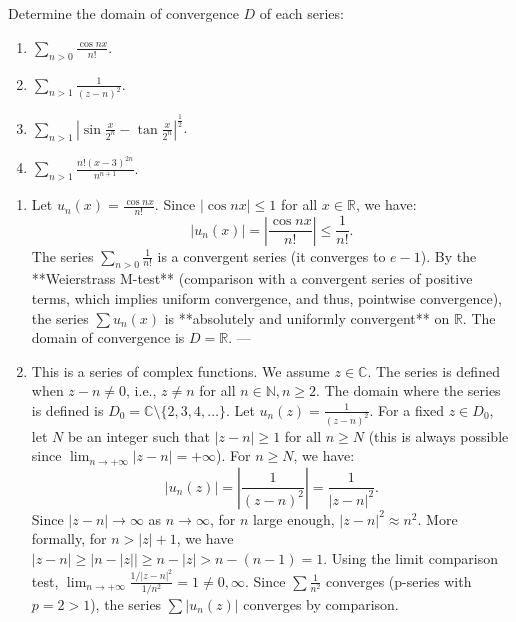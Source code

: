 \documentclass[12pt]{article}
\begin{document}
\section{}
Determine the domain of convergence $D$ of each series:

\begin{enumerate}
    \item $\sum_{n>0} \frac{\cos nx}{n!}$.
    \item $\sum_{n>1} \frac{1}{(z-n)^2}$.
    \item $\sum_{n>1} \left|\sin\frac{x}{2^n} - \tan\frac{x}{2^n}\right|^{\frac{1}{2}}$.
    \item $\sum_{n>1} \frac{n!(x-3)^{2n}}{n^{n+1}}$.
\end{enumerate}

\begin{correctionbox}
\begin{enumerate}
    \item 
    Let $u_n(x) = \frac{\cos nx}{n!}$.
    Since $|\cos nx| \leq 1$ for all $x \in \mathbb{R}$, we have:
    $$ |u_n(x)| = \left|\frac{\cos nx}{n!}\right| \leq \frac{1}{n!}. $$
    The series $\sum_{n>0} \frac{1}{n!}$ is a convergent series (it converges to $e-1$).
    By the **Weierstrass M-test** (comparison with a convergent series of positive terms, which implies uniform convergence, and thus, pointwise convergence), the series $\sum u_n(x)$ is **absolutely and uniformly convergent** on $\mathbb{R}$.
    The domain of convergence is $D = \mathbb{R}$.
    ---
    \item 
    This is a series of complex functions. We assume $z \in \mathbb{C}$. The series is defined when $z-n \neq 0$, i.e., $z \neq n$ for all $n \in \mathbb{N}, n \geq 2$.
    The domain where the series is defined is $D_0 = \mathbb{C} \setminus \{2, 3, 4, \ldots\}$.
    Let $u_n(z) = \frac{1}{(z-n)^2}$.
    For a fixed $z \in D_0$, let $N$ be an integer such that $|z-n| \geq 1$ for all $n \geq N$ (this is always possible since $\lim_{n \to +\infty} |z-n| = +\infty$).
    For $n \geq N$, we have:
    $$ |u_n(z)| = \left|\frac{1}{(z-n)^2}\right| = \frac{1}{|z-n|^2}. $$
    Since $|z-n| \to \infty$ as $n \to \infty$, for $n$ large enough, $|z-n|^2 \approx n^2$.
    More formally, for $n > |z|+1$, we have $|z-n| \geq |n - |z|| \geq n - |z| > n - (n-1) = 1$.
    Using the limit comparison test, $\lim_{n \to +\infty} \frac{1/|z-n|^2}{1/n^2} = 1 \neq 0, \infty$.
    Since $\sum \frac{1}{n^2}$ converges (p-series with $p=2 > 1$), the series $\sum |u_n(z)|$ converges by comparison.

\end{enumerate}
\end{correctionbox}
\end{document}
